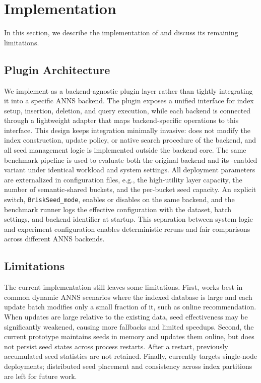 \section{Implementation}
In this section, we describe the implementation of \system and discuss its remaining limitations.
\subsection{Plugin Architecture}
We implement \system as a backend-agnostic plugin layer rather than tightly integrating it into a specific ANNS backend.
The plugin exposes a unified interface for index setup, insertion, deletion, and query execution, while each backend is connected through a lightweight adapter that maps backend-specific operations to this interface.
This design keeps integration minimally invasive: \system does not modify the index construction, update policy, or native search procedure of the backend, and all seed management logic is implemented outside the backend core. The same benchmark pipeline is used to evaluate both the original backend and its \system-enabled variant under identical workload and system settings.
All deployment parameters are externalized in configuration files, e.g., the high-utility layer capacity, the number of semantic-shared buckets, and the per-bucket seed capacity.
An explicit switch, \texttt{BriskSeed\_mode}, enables or disables \system on the same backend, and the benchmark runner logs the effective configuration with the dataset, batch settings, and backend identifier at startup.
This separation between system logic and experiment configuration enables deterministic reruns and fair comparisons across different ANNS backends.


\subsection{Limitations}
The current implementation still leaves some limitations.
First, \system works best in common dynamic ANNS scenarios where the indexed database is large and each update batch modifies only a small fraction of it, such as online recommendation.
When updates are large relative to the existing data, seed effectiveness may be significantly weakened, causing more fallbacks and limited speedups.
Second, the current prototype maintains seeds in memory and updates them online, but does not persist seed states across process restarts.
After a restart, previously accumulated seed statistics are not retained.
Finally, \system currently targets single-node deployments; distributed seed placement and consistency across index partitions are left for future work.